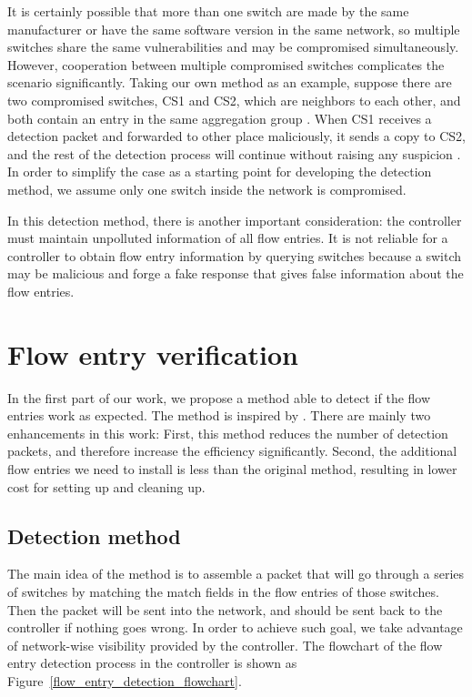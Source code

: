 It is certainly possible that more than one switch are made by the same manufacturer or have the same software version in the same network, so multiple switches share the same vulnerabilities and may be compromised simultaneously. However, cooperation between multiple compromised switches complicates the scenario significantly. Taking our own method as an example, suppose there are two compromised switches, CS1 and CS2, which are neighbors to each other, and both contain an entry in the same aggregation group . When CS1 receives a detection packet and forwarded to other place maliciously, it sends a copy to CS2, and the rest of the detection process will continue without raising any suspicion . In order to simplify the case as a starting point for developing the detection method, we assume only one switch inside the network is compromised.

In this detection method, there is another important consideration: the controller must maintain unpolluted information of all flow entries. It is not reliable for a controller to obtain flow entry information by querying switches because a switch may be malicious and forge a fake response that gives false information about the flow entries.

\section{Flow entry verification}
In the first part of our work, we propose a method able to detect if the flow entries work as expected. The method is inspired by \cite{CKGL15}. There are mainly two enhancements in this work: First, this method reduces the number of detection packets, and therefore increase the efficiency significantly. Second, the additional flow entries we need to install is less than the original method, resulting in lower cost for setting up and cleaning up. 

\subsection{Detection method}
\label{Detection_method}
The main idea of the method is to assemble a packet that will go through a series of switches by matching the match fields in the flow entries of those switches. Then the packet will be sent into the network, and should be sent back to the controller if nothing goes wrong. In order to achieve such goal, we take advantage of network-wise visibility provided by the controller. The flowchart of the flow entry detection process in the controller is shown as Figure~\ref{flow_entry_detection_flowchart}. 

